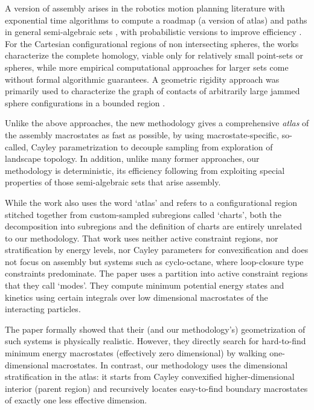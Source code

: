 \documentclass[]{article}
\newcommand{\rahul}[1]{\color{black}{#1}\color{black}}
\begin{document}
A version of assembly arises in the robotics motion planning literature with
exponential time algorithms to compute a roadmap (a version of atlas) and paths
in general semi-algebraic sets \cite{bib:canny-roadmap, canny-alg,basu}, with
probabilistic versions to improve efficiency \cite{kavraki1, kavraki2}. For the
Cartesian configurational regions of non intersecting spheres, the works
\cite{Baryshnikov08022013, Kahle2011} characterize the complete homology,
viable only for relatively small point-sets or spheres, while more empirical
computational approaches for larger sets \cite{PhysRevE,
Bubenik10statisticaltopology} come without formal algorithmic guarantees. A
geometric rigidity approach was primarily used to characterize the graph of
contacts of arbitrarily large jammed sphere configurations in a bounded region
\cite{Kahle2012, Connelly:Jamming}.

Unlike the above approaches, the new methodology gives a comprehensive
\emph{atlas} of the assembly macrostates as fast as possible, by using
macrostate-specific, so-called, Cayley parametrization to decouple sampling
from exploration of landscape topology. In addition, unlike many former
approaches, our methodology is deterministic, its efficiency following from
exploiting special properties of those semi-algebraic sets that arise \rahul{in }
assembly.

While the work\cite{Jaillet2017} also uses the word `atlas' and refers to a
configurational region stitched together from custom-sampled subregions called
`charts', both the decomposition into subregions and the definition of charts
are entirely unrelated to our methodology. That work uses neither active
constraint regions, nor stratification by energy levels, nor Cayley parameters
for convexification and does not focus on assembly but systems such as
cyclo-octane, where loop-closure type constraints predominate. The paper
\cite{Holmes-Cerfon2013} uses a partition into active constraint regions that
they call `modes'. They compute minimum potential energy states and kinetics
using certain integrals over low dimensional macrostates of the interacting
particles.

The paper \cite{Holmes-Cerfon2013} formally showed that their (and our
methodology's) geometrization of such systems is physically realistic. However,
they directly search for hard-to-find minimum energy macrostates (effectively
zero dimensional) by walking one-dimensional macrostates. In contrast, our
methodology uses the dimensional stratification in the atlas: it starts from
Cayley convexified higher-dimensional interior (parent region) and recursively
locates easy-to-find boundary macrostates of exactly one less effective
dimension.
\end{document}
